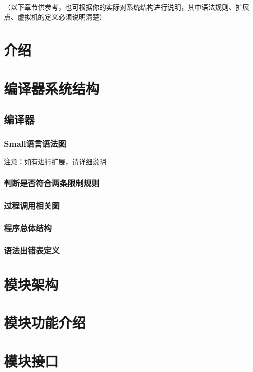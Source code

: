\documentclass{cdlabreport}
\begin{document}
（以下章节供参考，也可根据你的实际对系统结构进行说明，其中语法规则、扩展点、虚拟机的定义必须说明清楚）

\section{介绍}

\section{编译器系统结构}

\subsection{编译器}

\subsubsection{Small语言语法图}

注意：如有进行扩展，请详细说明

\subsubsection{判断是否符合两条限制规则}

\subsubsection{过程调用相关图}

\subsubsection{程序总体结构}

\subsubsection{语法出错表定义}

\section{模块架构}

\section{模块功能介绍}

\section{模块接口}
\end{document}
